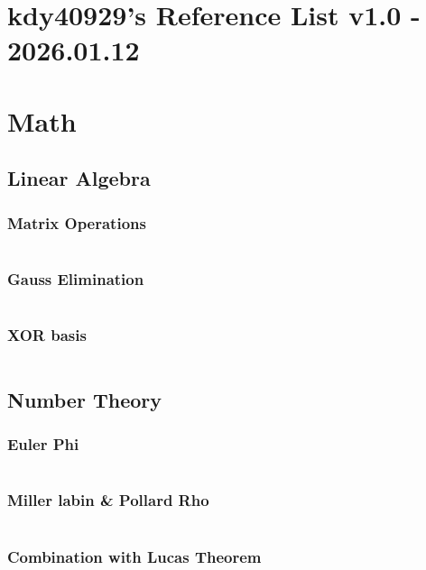 \documentclass[a4paper,landscape,9pt,twocolumn]{article}
\begin{document}
\raggedbottom

\section*{kdy40929's Reference List v1.0 - 2026.01.12}
\vspace{-2mm}
\renewcommand{\contentsname}{}
\tableofcontents

\newpage


\section{Math}
\subsection {Linear Algebra}
\subsubsection{Matrix Operations}
\inputminted{python}{codes/math/matrix.py}
\subsubsection{Gauss Elimination}
\inputminted{python}{codes/math/gauss.py}
\subsubsection{XOR basis}
\inputminted{python}{codes/math/xor_basis.py}

\subsection{Number Theory}
\subsubsection{Euler Phi}
\inputminted{python}{codes/math/euler_phi.py}
\subsubsection{Miller labin \& Pollard Rho}
\inputminted{python}{codes/math/miller_labin.py}
\subsubsection{Combination with Lucas Theorem}
\inputminted{python}{codes/math/lucas.py}
\end{document}
